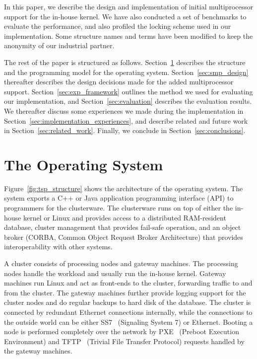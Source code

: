 In this paper, we describe the design and implementation of initial
multiprocessor support for the in-house kernel. We have also conducted a set of
benchmarks to evaluate the performance, and also profiled the locking scheme
used in our implementation. Some structure names and terms have been modified
to keep the anonymity of our industrial partner.

The rest of the paper is structured as follows.  Section~\ref{sec:tsp}
describes the structure and the programming model for the operating system.
Section~\ref{sec:smp_design} thereafter describes the design decisions made
for the added multiprocessor support.  Section~\ref{sec:exp_framework}
outlines the method we used for evaluating our implementation, and
Section~\ref{sec:evaluation} describes the evaluation results. We thereafter
discuss some experiences we made during the implementation in
Section~\ref{sec:implementation_experiences}, and describe related and future
work in Section~\ref{sec:related_work}. Finally, we conclude in
Section~\ref{sec:conclusions}.

\section{The Operating System}
\label{sec:tsp}
Figure~\ref{fig:tsp_structure} shows the architecture of the operating system.
The system exports a C++ or Java application programming interface (API) to
programmers for the clusterware. The clusterware runs on top of either the
in-house kernel or Linux and provides access to a distributed RAM-resident
database, cluster management that provides fail-safe operation, and an object
broker (CORBA, Common Object Request Broker Architecture) that provides
interoperability with other systems.

A cluster consists of processing nodes and gateway machines. The processing
nodes handle the workload and usually run the in-house kernel. Gateway
machines run Linux and act as front-ends to the cluster, forwarding traffic to
and from the cluster. The gateway machines further provide logging support for
the cluster nodes and do regular backups to hard disk of the database. The
cluster is connected by redundant Ethernet connections internally, while the
connections to the outside world can be either SS7~\cite{ituss7} (Signaling
System 7) or Ethernet.  Booting a node is performed completely over the
network by PXE~\cite{intel99pxe} (Preboot Execution Environment) and
TFTP~\cite{sollins92tftp} (Trivial File Transfer Protocol) requests handled by
the gateway machines.

